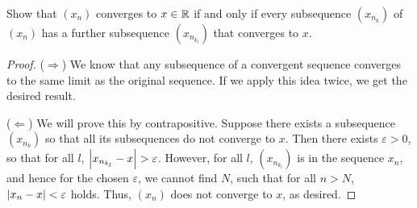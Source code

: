 \begin{exercise}{33}
Show that $(x_n)$ converges to $x\in\mathbb{R}$ if and only if every subsequence $(x_{n_k})$ of $(x_n)$ has a further subsequence $(x_{n_{k_l}})$ that converges to $x$.
\end{exercise}
\begin{proof}
($\Rightarrow$) We know that any subsequence of a convergent sequence converges to the same limit as the original sequence. If we apply this idea twice, we get the desired result.

($\Leftarrow$) We will prove this by contrapositive. Suppose there exists a subsequence $(x_{n_k})$ so that all its subsequences do not converge to $x$. Then there exists $\varepsilon>0$, so that for all $l$, $\left\lvert x_{n_{k_l}}-x\right\rvert>\varepsilon$. However, for all $l$, $(x_{n_{k_l}})$ is in the sequence $x_n$, and hence for the chosen $\varepsilon$, we cannot find $N$, such that for all $n>N$, $\left\lvert x_n-x\right\rvert<\varepsilon$ holds. Thus, $(x_n)$ does not converge to $x$, as desired.
\end{proof}

